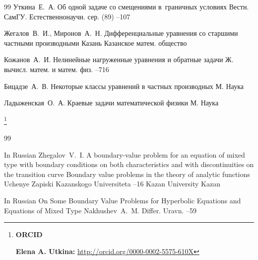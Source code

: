 {\begin{thebibliography}{99}
\by Уткина~Е.~А.
\paper Об одной задаче со смещениями в~граничных условиях
\jour Вестн. СамГУ. Естественнонаучн. сер.
(89)
--107

\by Жегалов~В.~И., Миронов~А.~Н.
\book Дифференциальные уравнения со старшими частными производными
\publaddr Казань
\publ Казанское матем. общество

\by Кожанов~А.~И.
\paper Нелинейные нагруженные уравнения и обратные задачи
\jour Ж. вычисл. матем. и матем. физ.
--716

\by Бицадзе~А.~В.
\book Некоторые классы уравнений в частных производных
\publaddr М.
\publ Наука


\by Ладыженская~О.~А.
\book Краевые задачи математической физики
\publaddr М.
\publ Наука

\end{thebibliography}

\RuDate

\bigskip

\makeentitle

\smallskip


\thanks{{\bf ORCID}

{\bf Elena A. Utkina:} \url{http://orcid.org/0000-0002-5575-610X}


}


\EngRef


\begin{thebibliography}{99}

\lang In Russian
\by Zhegalov~V.~I.
\paper A boundary-value problem for an equation of mixed type with boundary conditions on both characteristics and with discontinuities on the transition curve
\inbook Boundary value problems in the theory of analytic functions
\serial Uchenye Zapiski Kazanskogo Universiteta
--16
\publ Kazan University
\publaddr Kazan


\lang In Russian
\paper On Some Boundary Value Problems for Hyperbolic Equations and Equations of Mixed Type
\by Nakhushev~A.~M.
\jour Differ. Uravn.
--59



\end{thebibliography}}
